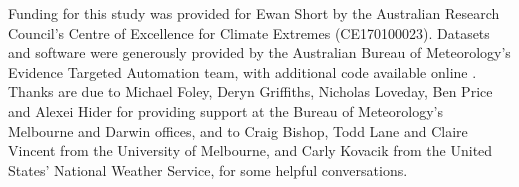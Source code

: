 \documentclass{ametsoc}
\begin{document}
\acknowledgments
Funding for this study was provided for Ewan Short by the Australian Research Council's Centre of Excellence for Climate Extremes (CE170100023). Datasets and software were generously provided by the Australian Bureau of Meteorology's Evidence Targeted Automation team, with additional code available online \citep{shortGitVeri19}. Thanks are due to Michael Foley, Deryn Griffiths, Nicholas Loveday, Ben Price and Alexei Hider for providing support at the Bureau of Meteorology's Melbourne and Darwin offices, and to Craig Bishop, Todd Lane and Claire Vincent from the University of Melbourne, and Carly Kovacik from the United States' National Weather Service, for some helpful conversations. 



\end{document}
